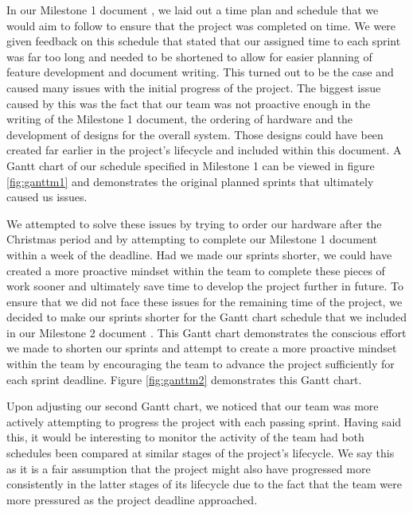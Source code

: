                 In our Milestone 1 document \cite{coaker}, we laid out a time plan and schedule that we would aim to follow to ensure that the project was completed on time. We were given feedback on this schedule that stated that our assigned time to each sprint was far too long and needed to be shortened to allow for easier planning of feature development and document writing. This turned out to be the case and caused many issues with the initial progress of the project. The biggest issue caused by this was the fact that our team was not proactive enough in the writing of the Milestone 1 document, the ordering of hardware and the development of designs for the overall system. Those designs could have been created far earlier in the project's lifecycle and included within this document. A Gantt chart of our schedule specified in Milestone 1 can be viewed in figure \ref{fig:ganttm1} and demonstrates the original planned sprints that ultimately caused us issues.

                
                
                We attempted to solve these issues by trying to order our hardware after the Christmas period and by attempting to complete our Milestone 1 document within a week of the deadline. Had we made our sprints shorter, we could have created a more proactive mindset within the team to complete these pieces of work sooner and ultimately save time to develop the project further in future. To ensure that we did not face these issues for the remaining time of the project, we decided to make our sprints shorter for the Gantt chart schedule that we included in our Milestone 2 document \cite{mile2}. This Gantt chart demonstrates the conscious effort we made to shorten our sprints and attempt to create a more proactive mindset within the team by encouraging the team to advance the project sufficiently for each sprint deadline. Figure \ref{fig:ganttm2} demonstrates this Gantt chart.

                

                Upon adjusting our second Gantt chart, we noticed that our team was more actively attempting to progress the project with each passing sprint. Having said this, it would be interesting to monitor the activity of the team had both schedules been compared at similar stages of the project's lifecycle. We say this as it is a fair assumption that the project might also have progressed more consistently in the latter stages of its lifecycle due to the fact that the team were more pressured as the project deadline approached.

